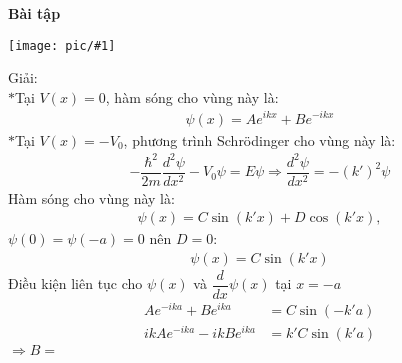 \documentclass{report}
\newcommand{\image}[1]{
	\begin{center}
		\texttt{[image: pic/\#1]}
	\end{center}
}
\newcommand{\f}[2]{\dfrac{#1}{#2}}
\begin{document}
		\textbf{Bài tập}
		\image{prob10_5.png}
		Giải:\\
	$\ast$Tại $V(x) = 0$, hàm sóng cho vùng này là:
		\begin{align*}
			\psi(x) = A e^{ikx} + B e^{-ikx}
		\end{align*}
	$\ast$Tại $V(x) = -V_0$, phương trình Schr\"{o}dinger cho vùng này là:
		\begin{align*}
			-\f{\hbar^2}{2m}\f{d^2\psi}{dx^2} - V_0 \psi = E\psi \Rightarrow \f{d^2\psi}{dx^2} = -(k')^2\psi
		\end{align*}
		Hàm sóng cho vùng này là:
		\begin{align*}
			\psi(x) = C \sin(k'x) + D\cos(k'x),
		\end{align*}
	$\psi (0) = \psi (-a) = 0$ nên $D = 0$:
		\begin{align*}
			\psi(x) = C \sin(k'x)
		\end{align*}
		Điều kiện liên tục cho $\psi(x)$ và $\f{d}{dx}\psi(x)$ tại $x= - a$
		\begin{align*}
			A e^{-ika} + B e^{ika}        & = C \sin(-k'a)   \\
			ik A e^{-ika} -  ik B e^{ika} & = k' C \sin(k'a)
		\end{align*}
	$\Rightarrow B = $
\end{document}
